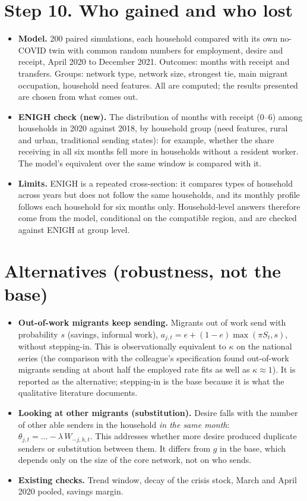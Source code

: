 \documentclass[11pt]{article}
\begin{document}
\section*{Step 10. Who gained and who lost}

\begin{itemize}[leftmargin=*]
\item \textbf{Model.} 200 paired simulations, each household compared with its own no-COVID twin with common random numbers for employment, desire and receipt, April 2020 to December 2021. Outcomes: months with receipt and transfers. Groups: network type, network size, strongest tie, main migrant occupation, household need features. All are computed; the results presented are chosen from what comes out.
\item \textbf{ENIGH check (new).} The distribution of months with receipt (0--6) among households in 2020 against 2018, by household group (need features, rural and urban, traditional sending states): for example, whether the share receiving in all six months fell more in households without a resident worker. The model's equivalent over the same window is compared with it.
\item \textbf{Limits.} ENIGH is a repeated cross-section: it compares types of household across years but does not follow the same households, and its monthly profile follows each household for six months only. Household-level answers therefore come from the model, conditional on the compatible region, and are checked against ENIGH at group level.
\end{itemize}

\section*{Alternatives (robustness, not the base)}

\begin{itemize}[leftmargin=*]
\item \textbf{Out-of-work migrants keep sending.} Migrants out of work send with probability $s$ (savings, informal work), $a_{j,t} = e + (1 - e)\max(\pi S_t, s)$, without stepping-in. This is observationally equivalent to $\kappa$ on the national series (the comparison with the colleague's specification found out-of-work migrants sending at about half the employed rate fits as well as $\kappa \approx 1$). It is reported as the alternative; stepping-in is the base because it is what the qualitative literature documents.
\item \textbf{Looking at other migrants (substitution).} Desire falls with the number of other able senders in the household \emph{in the same month}: $\theta_{j,t} = \dots - \lambda\,W_{-j,h,t}$. This addresses whether more desire produced duplicate senders or substitution between them. It differs from $g$ in the base, which depends only on the size of the core network, not on who sends.
\item \textbf{Existing checks.} Trend window, decay of the crisis stock, March and April 2020 pooled, savings margin.
\end{itemize}
\end{document}
